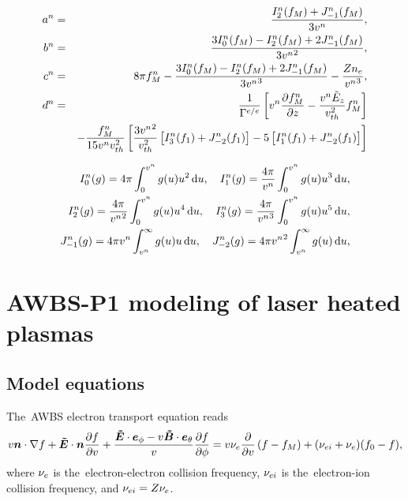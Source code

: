\begin{eqnarray}
  a^n &=& \frac{I^n_2(f_M) + J^n_{-1}(f_M)}{3v^n} ,
  \nonumber \\
  b^n &=& \frac{3 I^n_0(f_M) - I^n_2(f_M) + 2 J^n_{-1}(f_M)}{3{v^n}^2} ,
  \nonumber \\
  c^n &=& 8\pi f_M^n  - \frac{3 I^n_0(f_M) - I^n_2(f_M) + 2 J^n_{-1}(f_M)}
  {3{v^n}^3} - \frac{Z n_e}{{v^n}^3},
  \nonumber \\
  d^n &=& \frac{1}{\Gamma^{e/e}}
  \left[v^n\frac{\partial{f_M^n}}{\partial{z}} - \frac{v^n\tilde{E}_z}{v_{th}^2}f_M^n\right]
  \nonumber \\
  &&- \frac{f_M^n}{15 v^nv_{th}^2} \left[\frac{3{v^n}^2}{v_{th}^2}
  \left[I^n_{3}(f_1) + J^n_{-2}(f_1)\right]
  - 5 \left[I^n_1(f_1) + J^n_{-2}(f_1)\right] \right]
  \nonumber
\end{eqnarray}

\begin{eqnarray}
  I^n_0(g) = 4\pi \int_0^{v^n} g(u) u^{2}
  \, \text{d} u ,\quad
  I^n_1(g) = \frac{4\pi}{v^n} \int_0^{v^n} g(u) u^{3}
  \, \text{d} u ,
  \nonumber \\
  I^n_2(g) = \frac{4\pi}{{v^n}^2} \int_0^{v^n} g(u) u^{4}
  \, \text{d} u ,\quad 
  I^n_3(g) = \frac{4\pi}{{v^n}^3} \int_0^{v^n} g(u) u^{5}
  \, \text{d} u ,
  \nonumber \\
  J^n_{-1}(g) = 4\pi v^n \int_{v^n}^\infty 
  g(u) u\, \text{d} u ,\quad
  J^n_{-2}(g) = 4\pi{v^n}^2 \int_{v^n}^\infty 
  g(u) \, \text{d} u ,
  \nonumber
\end{eqnarray}

\section{AWBS-P1 modeling of laser heated plasmas}\label{sec:OOE_AWBSP1}
\subsection{Model equations}
The~AWBS electron transport equation reads
\begin{multline}
  v\boldsymbol{n}\cdot\nabla f + \boldsymbol{\tilde{E}}\cdot\boldsymbol{n} \frac{\partial{f}}{\partial{v}} 
  + \frac{\boldsymbol{\tilde{E}}\cdot\boldsymbol{e}_\phi 
  - v\boldsymbol{\tilde{B}}\cdot\boldsymbol{e}_\theta}{v}\frac{\partial{f}}{\partial{\phi}}
  =
  v \nu_{e} \frac{\partial{}}{\partial{v}}\left(f - f_M\right) 
  + (\nu_{ei} + \nu_{e}) (f_0 - f) ,
  \nonumber \label{eq:AWBS_model}
\end{multline}
where $\nu_{e}$ is the~electron-electron collision frequency, 
$\nu_{ei}$ is the~electron-ion collision frequency, and $\nu_{ei} = Z \nu_{e}$.

